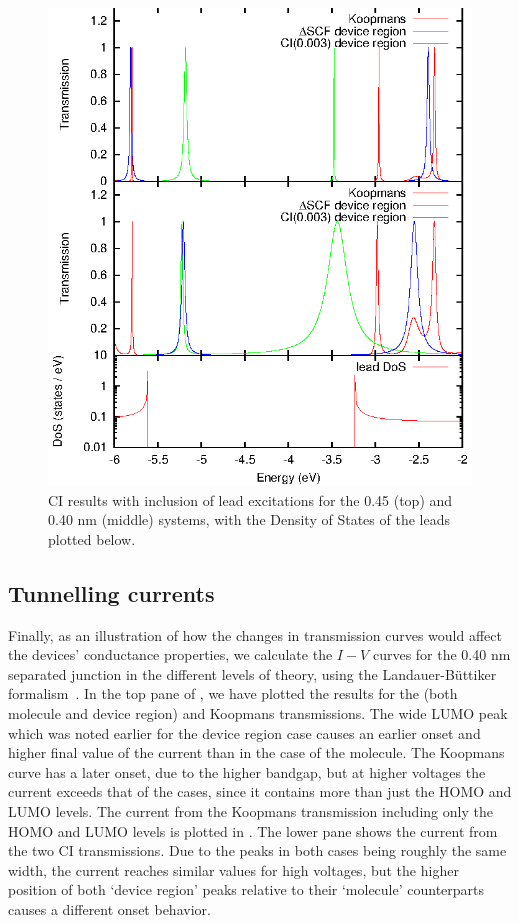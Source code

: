 \begin{figure}
	\begin{center}
		\includegraphics[width=0.9\linewidth]{figures/figure8a_8c}
	\end{center}
	\caption{CI results with inclusion of lead excitations for the
	         0.45 (top) and 0.40 nm (middle) systems, with the Density
		 of States of the leads plotted below.}
	\label{fig:cidevregion}
\end{figure}

\subsection{Tunnelling currents}
Finally, as an illustration of how the changes in transmission curves would
affect the devices' conductance properties, we calculate the $I-V$ curves
for the 0.40 nm separated junction in the different levels of theory,
using the Landauer-B\"uttiker formalism~\cite{buttiker1986}. In the top
pane of , we have plotted the results for the \dscf (both
molecule and device region) and Koopmans transmissions. The wide LUMO
peak which was noted earlier for the device region case causes an earlier
onset and higher final value of the current than in the case of the
molecule. The Koopmans curve has a later onset, due to the higher bandgap,
but at higher voltages the current exceeds that of the \dscf cases, since
it contains more than just the HOMO and LUMO levels. The current from
the Koopmans transmission including only the HOMO and LUMO levels is
plotted in . The lower pane shows the current from the two CI
transmissions. Due to the peaks in both cases being roughly the same
width, the current reaches similar values for high voltages, but the
higher position of both `device region' peaks relative to their `molecule'
counterparts causes a different onset behavior.

